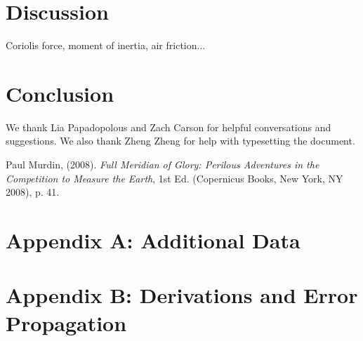 \documentclass[iop]{emulateapj}
\begin{document}











\section{Discussion}
\label{sec:discuss}

Coriolis force, moment of inertia, air friction...














\section{Conclusion}














\acknowledgments

We thank Lia Papadopolous and Zach Carson for helpful conversations and 
suggestions.  We also thank Zheng Zheng for help with typesetting the 
document.






\begin{thebibliography}{}

\bibitem[]{}
Paul Murdin, (2008). {\it Full Meridian of Glory: Perilous Adventures in the Competition to Measure the Earth}, 1st Ed. (Copernicus Books, New York, NY 2008), p. 41.

\end{thebibliography}{}



\appendix
{}
\section{Appendix A: Additional Data}


\appendix
{}
\section{Appendix B: Derivations and Error Propagation}
\end{document}
